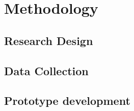 \chapter{Methodology}\label{chapter:methodology}
\section{Research Design}\label{section:research_design}
\section{Data Collection}\label{section:data_collection}
\section{Prototype development}\label{section:prototype_development}
